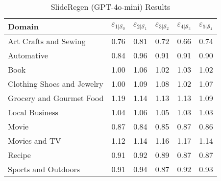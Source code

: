 \begin{table}[h]
    \centering
    \scriptsize
    \def\arraystretch{.99}
    \setlength{\tabcolsep}{0.42em}
    \begin{tabular}{lccccc}
      \toprule
      \textbf{Domain} & $\varepsilon_{1|\mathcal{S}_0}$ & $\varepsilon_{2|\mathcal{S}_1}$ & $\varepsilon_{3|\mathcal{S}_2}$ & $\varepsilon_{4|\mathcal{S}_3}$ & $\varepsilon_{5|\mathcal{S}_4}$ \\
      \midrule
      Art Crafts and Sewing     & 0.76 & 0.81 & 0.72 & 0.66 & 0.74 \\
      Automative                & 0.84 & 0.96 & 0.91 & 0.91 & 0.90 \\
      Book                      & 1.00 & 1.06 & 1.02 & 1.03 & 1.02 \\
      Clothing Shoes and Jewelry& 1.00 & 1.09 & 1.08 & 1.02 & 1.07 \\
      Grocery and Gourmet Food  & 1.19 & 1.14 & 1.13 & 1.13 & 1.09 \\
      Local Business            & 1.04 & 1.06 & 1.05 & 1.03 & 1.03 \\
      Movie                     & 0.87 & 0.84 & 0.85 & 0.87 & 0.86 \\
      Movies and TV             & 1.12 & 1.14 & 1.16 & 1.17 & 1.14 \\
      Recipe                    & 0.91 & 0.92 & 0.89 & 0.87 & 0.87 \\
      Sports and Outdoors       & 0.91 & 0.94 & 0.87 & 0.92 & 0.93 \\
      \bottomrule
    \end{tabular}
    \caption{SlideRegen (GPT-4o-mini) Results}
    \label{tab:slideregen_results}
    \vspace{-0.1cm}
  \end{table}
  


